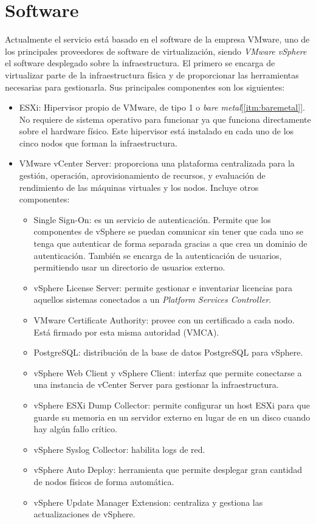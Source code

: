 \section{Software}
\label{subsec:softwareinstalado}
Actualmente el servicio está basado en el software de la empresa VMware, uno de los principales proveedores de software de virtualización, siendo \emph{VMware vSphere} el software desplegado sobre la infraestructura. El primero se encarga de virtualizar parte de la infraestructura física y de proporcionar las herramientas necesarias para gestionarla. Sus principales componentes son los siguientes:
\begin{itemize}
    \item ESXi: Hipervisor propio de VMware, de tipo 1 o \textit{bare metal}[\ref{itm:baremetal}]. No requiere de sistema operativo para funcionar ya que funciona directamente sobre el hardware físico\cite{Esxi}. Este hipervisor está instalado en cada uno de los cinco nodos que forman la infraestructura.
    \item VMware vCenter Server: proporciona una plataforma centralizada para la gestión, operación, aprovisionamiento de recursos, y evaluación de rendimiento de las máquinas virtuales y los nodos. Incluye otros componentes\cite{componentesCenterServer}:
        \begin{itemize}
            \item Single Sign-On: es un servicio de autenticación. Permite que los componentes de vSphere se puedan comunicar sin tener que cada uno se tenga que autenticar de forma separada gracias a que crea un dominio de autenticación. También se encarga de la autenticación de usuarios, permitiendo usar un directorio de usuarios externo.\label{itm:singlesingonEX}
            \item vSphere License Server: permite gestionar e inventariar licencias para aquellos sistemas conectados a un \emph{Platform Services Controller}.
            \item VMware Certificate Authority: provee con un certificado a cada nodo. Está firmado por esta misma autoridad (VMCA).
            \item PostgreSQL: distribución de la base de datos PostgreSQL para vSphere.
            \item vSphere Web Client y vSphere Client: interfaz que permite conectarse a una instancia de vCenter Server para gestionar la infraestructura.
            \item vSphere ESXi Dump Collector: permite configurar un host ESXi para que guarde su memoria en un servidor externo en lugar de en un disco cuando hay algún fallo crítico.
            \item vSphere Syslog Collector: habilita logs de red.
            \item vSphere Auto Deploy: herramienta que permite desplegar gran cantidad de nodos físicos de forma automática.
            \item vSphere Update Manager Extension: centraliza y gestiona las actualizaciones de vSphere. 
        \end{itemize}
    

\end{itemize}
